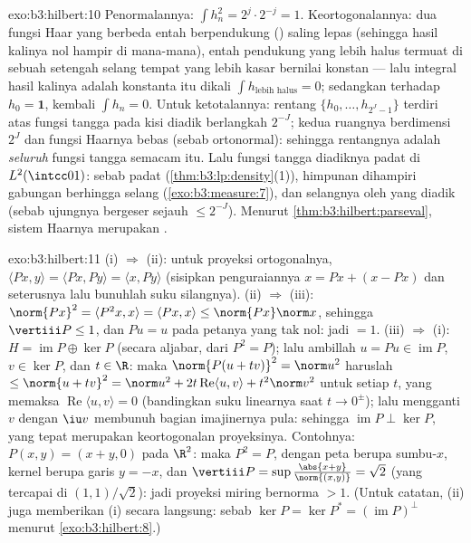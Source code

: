 \begin{solution}{exo:b3:hilbert:10}
Penormalannya: $\int h_n^2 = 2^j\cdot 2^{-j} = 1$.
Keortogonalannya: dua fungsi Haar yang berbeda entah
berpendukung () saling lepas (sehingga hasil kalinya nol hampir di mana-mana), entah
pendukung yang lebih halus termuat di sebuah setengah selang tempat yang
lebih kasar bernilai konstan --- lalu integral hasil kalinya adalah
konstanta itu dikali $\int h_{\text{lebih halus}} = 0$; sedangkan terhadap $h_0
= \mathbf 1$, kembali $\int h_n = 0$. Untuk ketotalannya: rentang
$\{h_0, \dots, h_{2^J-1}\}$ terdiri atas fungsi tangga pada
kisi diadik berlangkah $2^{-J}$; kedua ruangnya berdimensi
$2^J$ dan fungsi Haarnya bebas (sebab ortonormal):
sehingga rentangnya adalah \emph{seluruh} fungsi tangga semacam itu. Lalu fungsi
tangga diadiknya padat di $L^2(\intcc01)$: sebab 
padat (\cref{thm:b3:lp:density}(1)), himpunan 
dihampiri gabungan berhingga selang
(\cref{exo:b3:measure:7}), dan selangnya oleh yang diadik
(sebab ujungnya bergeser sejauh $\leq 2^{-J}$). Menurut
\cref{thm:b3:hilbert:parseval}, sistem Haarnya merupakan .
\end{solution}

\begin{solution}{exo:b3:hilbert:11}
(i) $\Rightarrow$ (ii): untuk proyeksi ortogonalnya,
$\langle Px, y\rangle = \langle Px, Py\rangle = \langle x,
Py\rangle$ (sisipkan penguraiannya $x = Px + (x - Px)$
dan seterusnya lalu bunuhlah suku silangnya). (ii) $\Rightarrow$ (iii):
$\norm{Px}^2 = \langle P^2x, x\rangle = \langle Px, x\rangle
\leq \norm{Px}\norm x$, sehingga $\vertiii P \leq 1$, dan $Pu = u$
pada petanya yang tak nol: jadi $= 1$. (iii) $\Rightarrow$ (i): $H =
\operatorname{im}P \oplus \ker P$ (secara aljabar, dari $P^2
= P$); lalu ambillah $u = Pu \in \operatorname{im}P$, $v \in \ker P$,
dan $t \in \R$: maka $\norm{P(u + tv)}^2 = \norm u^2$ haruslah $\leq
\norm{u + tv}^2 = \norm u^2 + 2t\operatorname{Re}\langle u,
v\rangle + t^2\norm v^2$ untuk setiap $t$, yang memaksa
$\operatorname{Re}\langle u, v\rangle = 0$ (bandingkan
suku linearnya saat $t \to 0^\pm$); lalu mengganti $v$ dengan $\iu v$
membunuh bagian imajinernya pula: sehingga $\operatorname{im}P \perp
\ker P$, yang tepat merupakan keortogonalan proyeksinya.
Contohnya: $P(x, y) = (x + y, 0)$ pada $\R^2$: maka $P^2 = P$,
dengan peta berupa sumbu-$x$, kernel berupa garis $y = -x$, dan
$\vertiii P = \sup\frac{\abs{x+y}}{\norm{(x,y)}} = \sqrt2$
(yang tercapai di $(1,1)/\sqrt2$): jadi proyeksi miring bernorma
$> 1$. (Untuk catatan, (ii) juga memberikan (i) secara langsung:
sebab $\ker P = \ker P^* = (\operatorname{im}P)^\perp$ menurut
\cref{exo:b3:hilbert:8}.)
\end{solution}

